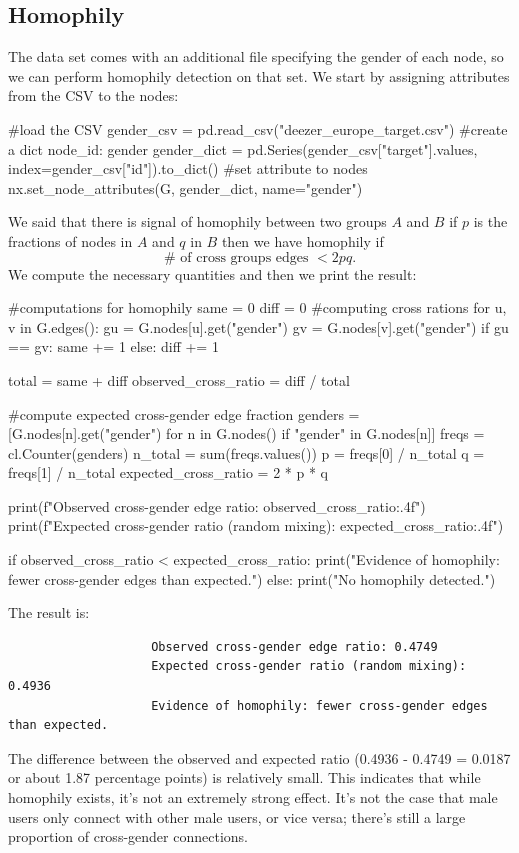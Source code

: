 \documentclass[12pt]{article}
\begin{document}
\subsection{Homophily}
The data set comes with an additional file specifying the gender of each node, so we can perform homophily detection on that set. We start by assigning attributes from the CSV to the nodes:
\begin{py}
	#load the CSV
	gender_csv = pd.read_csv("deezer_europe_target.csv")
	#create a dict {node_id: gender}
	gender_dict = pd.Series(gender_csv["target"].values, index=gender_csv["id"]).to_dict()
	#set attribute to nodes
	nx.set_node_attributes(G, gender_dict, name="gender")
\end{py}
We said that there is signal of homophily between two groups $A$ and $B$ if $p$ is the fractions of nodes in $A$ and $q$ in $B$ then we have homophily if \begin{equation*}
	\#\text{ of cross groups edges }<2pq.
\end{equation*}
We compute the necessary quantities and then we print the result:
\begin{py}
	#computations for homophily
	same = 0
	diff = 0
	#computing cross rations
	for u, v in G.edges():
		gu = G.nodes[u].get("gender")
		gv = G.nodes[v].get("gender")
		if gu == gv:
			same += 1
		else:
			diff += 1
	
	total = same + diff
	observed_cross_ratio = diff / total
	
	#compute expected cross-gender edge fraction
	genders = [G.nodes[n].get("gender") for n in G.nodes() if "gender" in G.nodes[n]]
	freqs = cl.Counter(genders)
	n_total = sum(freqs.values())
	p = freqs[0] / n_total
	q = freqs[1] / n_total
	expected_cross_ratio = 2 * p * q
	
	print(f"Observed cross-gender edge ratio: {observed_cross_ratio:.4f}")
	print(f"Expected cross-gender ratio (random mixing): {expected_cross_ratio:.4f}")
	
	if observed_cross_ratio < expected_cross_ratio:
		print("Evidence of homophily: fewer cross-gender edges than expected.")
	else:
		print("No homophily detected.")
\end{py}
The result is:
\begin{center}
	\begin{verbatim}
					Observed cross-gender edge ratio: 0.4749
					Expected cross-gender ratio (random mixing): 0.4936
					Evidence of homophily: fewer cross-gender edges than expected.
	\end{verbatim}
\end{center}
The difference between the observed and expected ratio (0.4936 - 0.4749 = 0.0187 or about 1.87 percentage points) is relatively small. This indicates that while homophily exists, it's not an extremely strong effect. It's not the case that male users only connect with other male users, or vice versa; there's still a large proportion of cross-gender connections.\par
\end{document}
